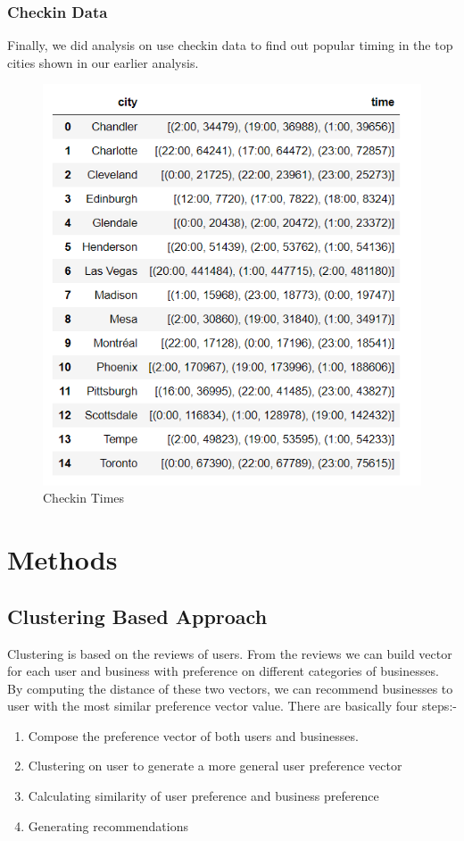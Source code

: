 \documentclass[11pt]{article}
\begin{document}
 	\subsubsection{Checkin Data}
 	Finally, we did analysis on use checkin data to find out popular timing in the top cities shown in our earlier analysis.
 
      \begin{figure}[H]
 		\centering
 		\includegraphics[scale=0.5] {checkin_times.png}
 		\caption{Checkin Times}
 	\end{figure}
 	
	\section{Methods}
		
		\subsection{Clustering Based Approach}
		Clustering is based on the reviews of users. From the reviews we can build vector for each user and business with preference on different categories of businesses. By computing the distance of these two vectors, we can recommend businesses to user with the most similar preference vector value.
		There are basically four steps:- 
		\begin{enumerate}
			\item  Compose the preference vector of both users and businesses.
			\item  Clustering on user to generate a more general user preference vector
			\item  Calculating similarity of user preference and business preference
			\item  Generating recommendations
		\end{enumerate}
		
\end{document}
